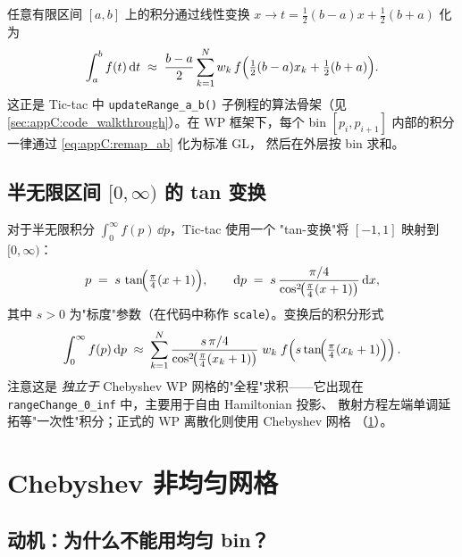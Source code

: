 任意有限区间 $[a,b]$ 上的积分通过线性变换 $x\to t=\tfrac{1}{2}(b-a)x+\tfrac{1}{2}(b+a)$ 化为
\begin{equation}
  \int_{a}^{b} f(t)\,\dd t \;\approx\; \frac{b-a}{2}\sum_{k=1}^{N} w_k\,
  f\Bigl(\tfrac{1}{2}(b-a)x_k+\tfrac{1}{2}(b+a)\Bigr).
  \label{eq:appC:remap_ab}
\end{equation}
这正是 Tic-tac 中 \texttt{updateRange\_a\_b()} 子例程的算法骨架（见
\cref{sec:appC:code_walkthrough}）。在 WP 框架下，每个 bin
$[p_i,p_{i+1}]$ 内部的积分一律通过 \eqref{eq:appC:remap_ab} 化为标准 GL，
然后在外层按 bin 求和。

\subsection{半无限区间 $[0,\infty)$ 的 tan 变换}
\label{sec:appC:tan_remap}

对于半无限积分 $\int_0^{\infty} f(p)\,\dd p$，Tic-tac 使用一个
"tan-变换"将 $[-1,1]$ 映射到 $[0,\infty)$：
\begin{equation}
  p \;=\; s\,\tan\!\Bigl(\tfrac{\pi}{4}(x+1)\Bigr),\qquad
  \dd p \;=\; s\,\frac{\pi/4}{\cos^{2}\!\bigl(\tfrac{\pi}{4}(x+1)\bigr)}\,\dd x,
  \label{eq:appC:tan_change}
\end{equation}
其中 $s>0$ 为"标度"参数（在代码中称作 \texttt{scale}）。变换后的积分形式
\begin{equation}
  \int_{0}^{\infty} f(p)\,\dd p \;\approx\; \sum_{k=1}^{N}
  \frac{s\,\pi/4}{\cos^{2}\!\bigl(\tfrac{\pi}{4}(x_k+1)\bigr)}\;w_k\;
  f\!\left(s\tan\!\Bigl(\tfrac{\pi}{4}(x_k+1)\Bigr)\right).
\end{equation}
注意这是 \emph{独立于} Chebyshev WP 网格的"全程"求积——它出现在
\texttt{rangeChange\_0\_inf} 中，主要用于自由 Hamiltonian 投影、
散射方程左端单调延拓等"一次性"积分；正式的 WP 离散化则使用 Chebyshev 网格
（\cref{sec:appC:cheb_mesh}）。

\section{Chebyshev 非均匀网格}
\label{sec:appC:cheb_mesh}

\subsection{动机：为什么不能用均匀 bin？}

